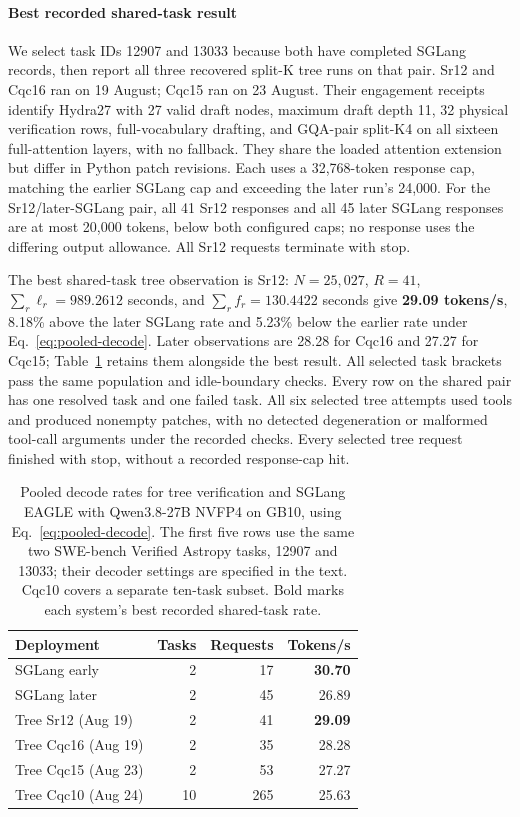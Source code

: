 \paragraph{Best recorded shared-task result}
We select task IDs 12907 and 13033 because both have completed SGLang records, then report all three recovered split-K tree runs on that pair. Sr12 and Cqc16 ran on 19 August; Cqc15 ran on 23 August. Their engagement receipts identify Hydra27 with 27 valid draft nodes, maximum draft depth 11, 32 physical verification rows, full-vocabulary drafting, and GQA-pair split-K4 on all sixteen full-attention layers, with no fallback. They share the loaded attention extension but differ in Python patch revisions. Each uses a 32,768-token response cap, matching the earlier SGLang cap and exceeding the later run's 24,000. For the Sr12/later-SGLang pair, all 41 Sr12 responses and all 45 later SGLang responses are at most 20,000 tokens, below both configured caps; no response uses the differing output allowance. All Sr12 requests terminate with stop.

The best shared-task tree observation is Sr12: $N=25{,}027$, $R=41$, $\sum_r\ell_r=989.2612$ seconds, and $\sum_r f_r=130.4422$ seconds give \textbf{29.09 tokens/s}, 8.18\% above the later SGLang rate and 5.23\% below the earlier rate under Eq.~\ref{eq:pooled-decode}. Later observations are 28.28 for Cqc16 and 27.27 for Cqc15; Table~\ref{tab:pooled-decode} retains them alongside the best result. All selected task brackets pass the same population and idle-boundary checks. Every row on the shared pair has one resolved task and one failed task. All six selected tree attempts used tools and produced nonempty patches, with no detected degeneration or malformed tool-call arguments under the recorded checks. Every selected tree request finished with stop, without a recorded response-cap hit.

\begin{table}[t]
\caption{Pooled decode rates for tree verification and SGLang EAGLE with Qwen3.8-27B NVFP4 on GB10, using Eq.~\ref{eq:pooled-decode}. The first five rows use the same two SWE-bench Verified Astropy tasks, 12907 and 13033; their decoder settings are specified in the text. Cqc10 covers a separate ten-task subset. Bold marks each system's best recorded shared-task rate.}
\label{tab:pooled-decode}
\centering\small
\begin{tabular}{@{}lrrr@{}}
\toprule
Deployment & Tasks & Requests & Tokens/s \\
\midrule
SGLang early & 2 & 17 & \textbf{30.70} \\
SGLang later & 2 & 45 & 26.89 \\
Tree Sr12 (Aug 19) & 2 & 41 & \textbf{29.09} \\
Tree Cqc16 (Aug 19) & 2 & 35 & 28.28 \\
Tree Cqc15 (Aug 23) & 2 & 53 & 27.27 \\
\midrule
Tree Cqc10 (Aug 24) & 10 & 265 & 25.63 \\
\bottomrule
\end{tabular}
\end{table}

